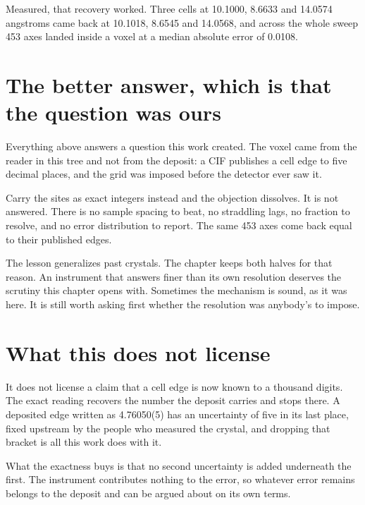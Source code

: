 Measured, that recovery worked. Three cells at 10.1000, 8.6633 and 14.0574 angstroms came back at 10.1018, 8.6545 and 14.0568, and across the whole sweep 453 axes landed inside a voxel at a median absolute error of 0.0108.

\section{The better answer, which is that the question was ours}

Everything above answers a question this work created. The voxel came from the reader in this tree and not from the deposit: a CIF publishes a cell edge to five decimal places, and the grid was imposed before the detector ever saw it.

Carry the sites as exact integers instead and the objection dissolves. It is not answered. There is no sample spacing to beat, no straddling lags, no fraction to resolve, and no error distribution to report. The same 453 axes come back equal to their published edges.

The lesson generalizes past crystals. The chapter keeps both halves for that reason. An instrument that answers finer than its own resolution deserves the scrutiny this chapter opens with. Sometimes the mechanism is sound, as it was here. It is still worth asking first whether the resolution was anybody's to impose.

\section{What this does not license}

It does not license a claim that a cell edge is now known to a thousand digits. The exact reading recovers the number the deposit carries and stops there. A deposited edge written as 4.76050(5) has an uncertainty of five in its last place, fixed upstream by the people who measured the crystal, and dropping that bracket is all this work does with it.

What the exactness buys is that no second uncertainty is added underneath the first. The instrument contributes nothing to the error, so whatever error remains belongs to the deposit and can be argued about on its own terms.
